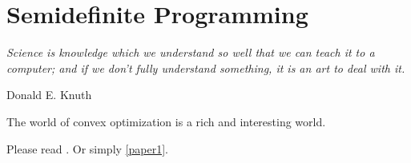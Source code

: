 \chapter{Semidefinite Programming}\label{ch3}
\epigraph{\textit{Science is knowledge which we understand so well that we can teach it to a computer; and if we don't fully understand something, it is an art to deal with it.}}{Donald E. Knuth}

The world of convex optimization is a rich and interesting world.


Please read . Or simply \cref{paper1}.


